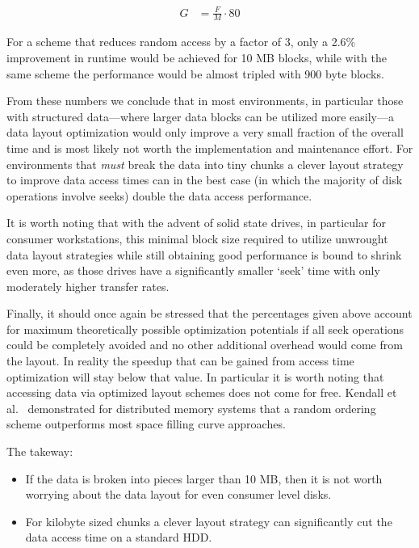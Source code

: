 \begin{align*}
G  &=   \frac{F}{M} \cdot 80
\end{align*}

For a scheme that reduces random access by a factor of 3, only a 2.6\%
improvement in runtime would be achieved for 10 MB blocks, while with
the same scheme the performance would be almost tripled with 900 byte
blocks.

From these numbers we conclude that in most environments, in particular
those with structured data---where larger data blocks can be utilized
more easily---a data layout optimization would only improve a very
small fraction of the overall time and is most likely not worth the
implementation and
maintenance effort. For environments that \emph{must} break the data
into tiny chunks a clever layout strategy to improve data access times
can in the best case (in which the majority of disk operations involve
seeks) double the data access performance.


It is worth noting that with the advent of solid state drives, in
particular for consumer workstations, this minimal block size required
to utilize unwrought data layout strategies while still obtaining
good performance is bound to shrink even more, as those drives have a
significantly smaller `seek' time with only moderately higher transfer
rates.

Finally, it should once again be stressed that the percentages
given above account for maximum theoretically possible optimization
potentials if all seek operations could be completely avoided and no
other additional overhead would come from the layout.  In reality the
speedup that can be gained from access time optimization will stay
below that value. In particular it is worth noting that accessing data
via optimized layout schemes does not come
for free. Kendall et al.~\cite{Kendall:2009:TDO} demonstrated for
distributed memory systems that a random ordering scheme outperforms
most space filling curve approaches.

The takeway:

\begin{itemize}
  \item If the data is broken into pieces larger than 10 MB, then it
  is not worth worrying about the data layout for even consumer level
  disks.
  \item For kilobyte sized chunks a clever layout strategy can
           significantly cut the data access time on a standard HDD.
\end{itemize}

